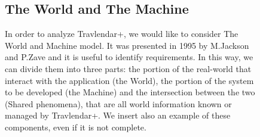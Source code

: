 \documentclass[12pt,titlepage]{article}
\begin{document}
\begin{figure}
\subsection{The World and The Machine}\label{sec:mod1}
\begin{flushleft}
In order to analyze Travlendar+, we would like to consider The World and Machine model. It was presented in 1995 by M.Jackson and P.Zave and it is useful to identify requirements. In this way, we can divide them into three parts: the portion of the real-world that interact with the application (the World), the portion of the system to be developed (the Machine) and the intersection between the two (Shared phenomena), that are all world information known or managed by Travlendar+.
We insert also an example of these components, even if it is not complete.
\end{flushleft}

\centering
{}
\end{figure}

\pagebreak
\end{document}

